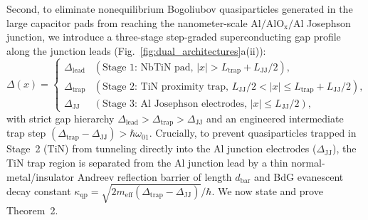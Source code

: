 \documentclass[11pt,letterpaper]{article}
\theoremstyle{definition}
\begin{document}
Second, to eliminate nonequilibrium Bogoliubov quasiparticles generated in the large capacitor pads from reaching the nanometer-scale $\mathrm{Al/AlO_x/Al}$ Josephson junction, we introduce a three-stage step-graded superconducting gap profile along the junction leads (Fig.~\ref{fig:dual_architectures}a(ii)):
\begin{equation}
  \Delta(x) = \begin{cases}
    \Delta_{\mathrm{lead}} & (\text{Stage 1: }\mathrm{NbTiN}\text{ pad, } |x| > L_{\mathrm{trap}} + L_{\mathrm{JJ}}/2), \\
    \Delta_{\mathrm{trap}} & (\text{Stage 2: }\mathrm{TiN}\text{ proximity trap, } L_{\mathrm{JJ}}/2 < |x| \le L_{\mathrm{trap}} + L_{\mathrm{JJ}}/2), \\
    \Delta_{\mathrm{JJ}} & (\text{Stage 3: }\mathrm{Al}\text{ Josephson electrodes, } |x| \le L_{\mathrm{JJ}}/2),
  \end{cases}
  \label{eq:graded_gap_profile}
\end{equation}
with strict gap hierarchy $\Delta_{\mathrm{lead}} > \Delta_{\mathrm{trap}} > \Delta_{\mathrm{JJ}}$ and an engineered intermediate trap step $(\Delta_{\mathrm{trap}} - \Delta_{\mathrm{JJ}}) > \hbar\omega_{01}$. Crucially, to prevent quasiparticles trapped in Stage~2 ($\mathrm{TiN}$) from tunneling directly into the $\mathrm{Al}$ junction electrodes ($\Delta_{\mathrm{JJ}}$), the $\mathrm{TiN}$ trap region is separated from the $\mathrm{Al}$ junction lead by a thin normal-metal/insulator Andreev reflection barrier of length $d_{\mathrm{bar}}$ and BdG evanescent decay constant $\kappa_{\mathrm{qp}} = \sqrt{2m_{\mathrm{eff}}(\Delta_{\mathrm{trap}} - \Delta_{\mathrm{JJ}})}/\hbar$. We now state and prove Theorem~2.
\end{document}
